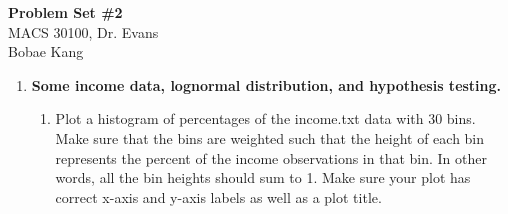 \documentclass[letterpaper,12pt]{article}
\theoremstyle{definition}
\begin{document}
\begin{flushleft}
  \textbf{\large{Problem Set \#2}} \\
  MACS 30100, Dr. Evans \\
  Bobae Kang
\end{flushleft}

\vspace{5mm}

\begin{enumerate}
\item \textbf{Some income data, lognormal distribution, and hypothesis testing.}
\begin{enumerate}
\item Plot a histogram of percentages of the income.txt data with 30 bins. Make sure that the bins are weighted such that the height of each bin represents the percent of the income observations in that bin. In other words, all the bin heights should sum to 1. Make sure your plot has correct x-axis and y-axis labels as well as a plot title.
\par
\begin{figure}[H]\centering\captionsetup{width=4.0in}
\end{figure}
\par\bigskip


\end{enumerate}
\end{enumerate}
\end{document}
